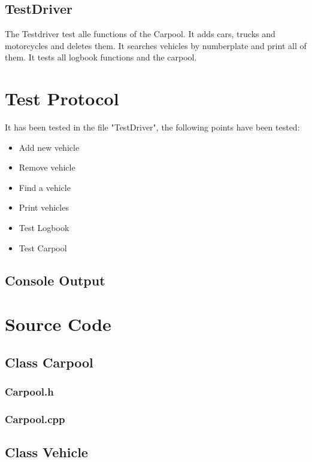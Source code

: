 \subsection{TestDriver}
The Testdriver test alle functions of the Carpool. It adds cars, trucks and motorcycles and deletes them.
It searches vehicles by numberplate and print all of them. It tests all logbook functions and the carpool.

\newpage
\section{Test Protocol}
It has been tested in the file "TestDriver", the following points have been tested:
\begin{itemize}
	\item Add new vehicle
	\item Remove vehicle
	\item Find a vehicle
	\item Print vehicles
	\item Test Logbook
	\item Test Carpool
\end{itemize}

\subsection{Console Output}
\newpage

\section{Source Code}

\subsection{Class Carpool}
\subsubsection{Carpool.h}
\subsubsection{Carpool.cpp}

\subsection{Class Vehicle}
